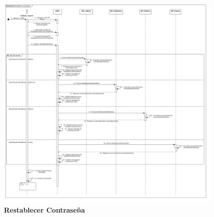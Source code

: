 \begin{figure}[H]
  \centering
    \includegraphics[scale=0.2,angle=90]{project/Secuencia/Restablecer_contrasena.jpg}
  \caption{\textbf{Restablecer Contraseña}}
\end{figure}
